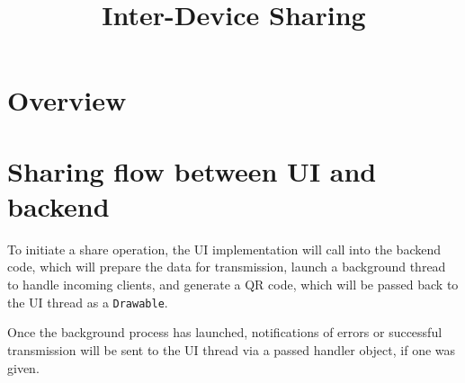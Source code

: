 \documentclass[12pt,notitlepage,letterpaper]{article}
\begin{document}
\title{Inter-Device Sharing}
\date{}
\maketitle

\section{Overview}

\section{Sharing flow between UI and backend}
To initiate a share operation, the UI implementation will call into the backend
code, which will prepare the data for transmission, launch a background thread
to handle incoming clients, and generate a QR code, which will be passed back to
the UI thread as a \texttt{Drawable}.

Once the background process has launched, notifications of errors or successful
transmission will be sent to the UI thread via a passed handler object, if one
was given.
\end{document}
